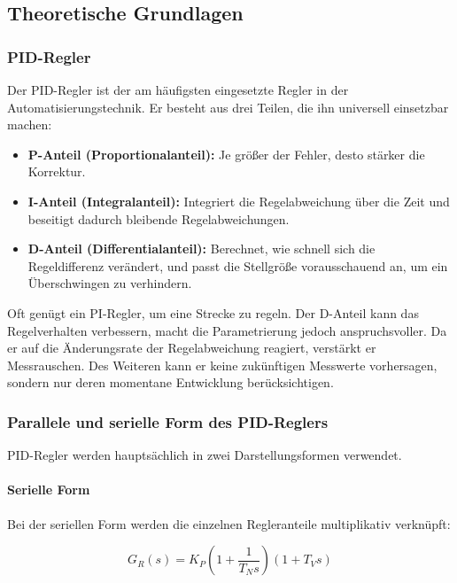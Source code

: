 \documentclass[11pt,a4paper]{article}
\begin{document}
\subsection{Theoretische Grundlagen}

\subsubsection{PID-Regler}

Der PID-Regler ist der am häufigsten eingesetzte Regler in der Automatisierungstechnik. Er besteht aus drei Teilen, die ihn universell einsetzbar machen:

\begin{itemize}
\item \textbf{P-Anteil (Proportionalanteil):} Je größer der Fehler, desto stärker die Korrektur.
\item \textbf{I-Anteil (Integralanteil):} Integriert die Regelabweichung über die Zeit und beseitigt dadurch bleibende Regelabweichungen.
\item \textbf{D-Anteil (Differentialanteil):} Berechnet, wie schnell sich die Regeldifferenz verändert, und passt die Stellgröße vorausschauend an, um ein Überschwingen zu verhindern.
\end{itemize}

Oft genügt ein PI-Regler, um eine Strecke zu regeln. Der D-Anteil kann das Regelverhalten verbessern, macht die Parametrierung jedoch anspruchsvoller. Da er auf die Änderungsrate der Regelabweichung reagiert, verstärkt er Messrauschen. Des Weiteren kann er keine zukünftigen Messwerte vorhersagen, sondern nur deren momentane Entwicklung berücksichtigen.

\subsubsection{Parallele und serielle Form des PID-Reglers}

PID-Regler werden hauptsächlich in zwei Darstellungsformen verwendet.

\paragraph{Serielle Form}

Bei der seriellen Form werden die einzelnen Regleranteile multiplikativ verknüpft:

\begin{equation}
G_R(s)=K_P \left(1+\frac{1}{T_N s}\right) \left(1+T_V s\right)
\end{equation}
\end{document}
